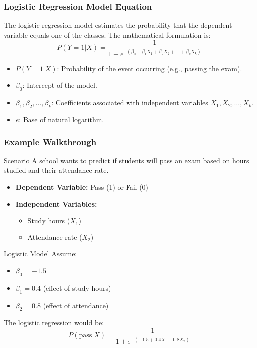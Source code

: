 \documentclass[aspectratio=169]{beamer}
\begin{document}
\begin{frame}[fragile]
    \frametitle{Logistic Regression Model Equation}
    The logistic regression model estimates the probability that the dependent variable equals one of the classes. The mathematical formulation is:
    \begin{equation}
        P(Y = 1 | X) = \frac{1}{1 + e^{-(\beta_0 + \beta_1X_1 + \beta_2X_2 + ... + \beta_kX_k)}}
    \end{equation}
    \begin{itemize}
        \item $P(Y = 1 | X)$: Probability of the event occurring (e.g., passing the exam).
        \item $\beta_0$: Intercept of the model.
        \item $\beta_1, \beta_2, \ldots, \beta_k$: Coefficients associated with independent variables $X_1, X_2, \ldots, X_k$.
        \item $e$: Base of natural logarithm.
    \end{itemize}
\end{frame}

\begin{frame}[fragile]
    \frametitle{Example Walkthrough}
    \begin{block}{Scenario}
        A school wants to predict if students will pass an exam based on hours studied and their attendance rate.
    \end{block}
    \begin{itemize}
        \item \textbf{Dependent Variable:} Pass (1) or Fail (0)
        \item \textbf{Independent Variables:} 
        \begin{itemize}
            \item Study hours ($X_1$)
            \item Attendance rate ($X_2$)
        \end{itemize}
    \end{itemize}
    \begin{block}{Logistic Model}
        Assume:
        \begin{itemize}
            \item $\beta_0 = -1.5$
            \item $\beta_1 = 0.4$ (effect of study hours)
            \item $\beta_2 = 0.8$ (effect of attendance)
        \end{itemize}
        The logistic regression would be:
        \begin{equation}
            P(\text{pass} | X) = \frac{1}{1 + e^{-(-1.5 + 0.4X_1 + 0.8X_2)}}
        \end{equation}
    \end{block}
\end{frame}
\end{document}
